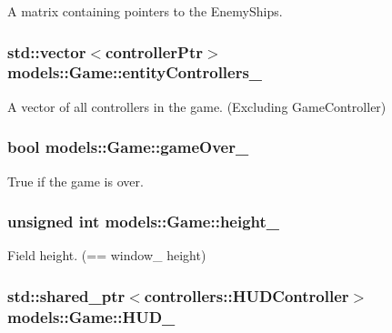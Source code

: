 \-A matrix containing pointers to the \-Enemy\-Ships. 

\hypertarget{classmodels_1_1Game_a46a3c85ae7b12a4189b3a62c02a7e860}{
\subsubsection[{entity\-Controllers\-\_\-}]{\setlength{\rightskip}{0pt plus 5cm}std\-::vector$<${\bf controller\-Ptr}$>$ {\bf models\-::\-Game\-::entity\-Controllers\-\_\-}}}\label{d1/d10/classmodels_1_1Game_a46a3c85ae7b12a4189b3a62c02a7e860}


\-A vector of all controllers in the game. (\-Excluding \-Game\-Controller) 

\hypertarget{classmodels_1_1Game_affccbd7e23754678c146a35bc5bad15e}{
\subsubsection[{game\-Over\-\_\-}]{\setlength{\rightskip}{0pt plus 5cm}bool {\bf models\-::\-Game\-::game\-Over\-\_\-}}}\label{d1/d10/classmodels_1_1Game_affccbd7e23754678c146a35bc5bad15e}


\-True if the game is over. 

\hypertarget{classmodels_1_1Game_a3f90aed51cc96528ec30c06c140f62be}{
\subsubsection[{height\-\_\-}]{\setlength{\rightskip}{0pt plus 5cm}unsigned int {\bf models\-::\-Game\-::height\-\_\-}}}\label{d1/d10/classmodels_1_1Game_a3f90aed51cc96528ec30c06c140f62be}


\-Field height. (== window\-\_\- height) 

\hypertarget{classmodels_1_1Game_a82397bfc1f7dc49aae6c06bcfc095c70}{
\subsubsection[{\-H\-U\-D\-\_\-}]{\setlength{\rightskip}{0pt plus 5cm}std\-::shared\-\_\-ptr$<${\bf controllers\-::\-H\-U\-D\-Controller}$>$ {\bf models\-::\-Game\-::\-H\-U\-D\-\_\-}}}\label{d1/d10/classmodels_1_1Game_a82397bfc1f7dc49aae6c06bcfc095c70}


